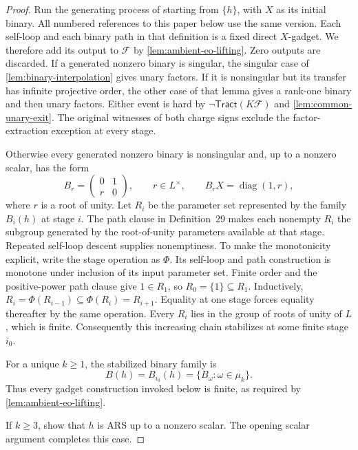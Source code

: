 \documentclass[11pt,letterpaper,onecolumn]{article}
\theoremstyle{plain}
\theoremstyle{definition}
\theoremstyle{remark}
\newcommand{\cF}{\mathcal F}
\newcommand{\Tract}{\mathsf{Tract}}
\begin{document}
\begin{proof}
		Run the generating process of
		\cite[arXiv v2, Definition~29]{MengWangXia2025EO} starting from \(\{h\}\),
		with \(X\) as its initial binary.  All numbered references to this
		paper below use the same version.  Each self-loop and each binary path in that
		definition is a fixed direct \(X\)-gadget.  We therefore add its output to
		\(\cF\) by \cref{lem:ambient-eo-lifting}. Zero outputs are
		discarded.  If a generated nonzero binary is singular, the singular case of
		\cref{lem:binary-interpolation} gives unary factors.  If it is nonsingular
		but its transfer has infinite projective order, the other case of that lemma
		gives a rank-one binary and then unary factors.  Either event is hard by
		\(\neg\Tract(K\cF)\) and \cref{lem:common-unary-exit}.  The original witnesses
		of both charge signs exclude the factor-extraction exception at every
		stage.
		
		Otherwise every generated nonzero binary is nonsingular and,
		up to a nonzero scalar, has the form
		\[
		B_r=\begin{pmatrix}0&1\\ r&0\end{pmatrix},
		\qquad r\in L^\times,
		\qquad B_rX=\operatorname{diag}(1,r),
		\]
		where \(r\) is a root of unity.  Let \(R_i\) be the parameter set represented
		by the family \(B_i(h)\) at stage \(i\).  The path clause in
		Definition~29 makes each nonempty \(R_i\) the subgroup generated by the
		root-of-unity parameters available at that stage. Repeated self-loop descent
		\cite[Lemma~39]{MengWangXia2025EO} supplies nonemptiness.  To make the
		monotonicity explicit, write the stage operation as \(\Phi\).
		Its self-loop and path construction is monotone under inclusion of its
		input parameter set.  Finite order and the positive-power path clause give
		\(1\in R_1\), so \(R_0=\{1\}\subseteq R_1\).  Inductively,
		\(R_i=\Phi(R_{i-1})\subseteq\Phi(R_i)=R_{i+1}\).
		Equality at one stage forces equality thereafter by the same operation.
		Every \(R_i\) lies in the group of roots of unity of \(L\), which is finite.
		Consequently this increasing chain stabilizes at some finite stage \(i_0\).
		
        For a unique \(k\ge1\), the stabilized binary family is
		\[
		B(h)=B_{i_0}(h)=\{B_\omega:\omega\in\mu_k\}.
		\]
		Thus every gadget construction invoked below is finite, as
		required by \cref{lem:ambient-eo-lifting}.
		
		If \(k\ge3\), \cite[Lemmas~40--42]{MengWangXia2025EO} show that \(h\) is
		ARS up to a nonzero scalar.  The opening scalar argument completes this case.
		

\end{proof}
\end{document}
